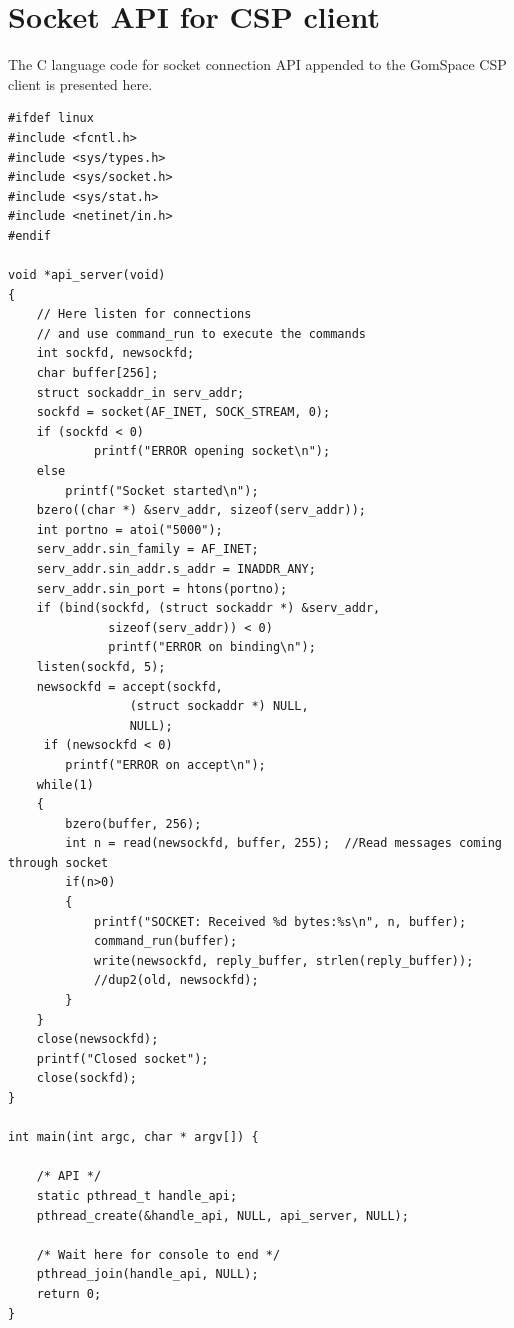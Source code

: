 \documentclass[english,12pt,a4paper,pdftex,elec,utf8]{aaltothesis}
\begin{document}
\section{Socket API for CSP client\label{LiiteD}}
The C language code for socket connection API appended to the GomSpace CSP client is presented here.
\begin{verbatim}
#ifdef linux
#include <fcntl.h>
#include <sys/types.h>
#include <sys/socket.h>
#include <sys/stat.h>
#include <netinet/in.h>
#endif

void *api_server(void)
{
	// Here listen for connections
	// and use command_run to execute the commands
	int sockfd, newsockfd;
    char buffer[256];
	struct sockaddr_in serv_addr;
	sockfd = socket(AF_INET, SOCK_STREAM, 0);
	if (sockfd < 0) 
        	printf("ERROR opening socket\n");
	else
		printf("Socket started\n");
	bzero((char *) &serv_addr, sizeof(serv_addr));
    int portno = atoi("5000");
    serv_addr.sin_family = AF_INET;
    serv_addr.sin_addr.s_addr = INADDR_ANY;
	serv_addr.sin_port = htons(portno);
	if (bind(sockfd, (struct sockaddr *) &serv_addr,
              sizeof(serv_addr)) < 0) 
              printf("ERROR on binding\n");
	listen(sockfd, 5);
	newsockfd = accept(sockfd, 
                 (struct sockaddr *) NULL, 
                 NULL);
     if (newsockfd < 0) 
        printf("ERROR on accept\n");
	while(1)
	{
		bzero(buffer, 256);
		int n = read(newsockfd, buffer, 255);  //Read messages coming through socket
		if(n>0)
		{
			printf("SOCKET: Received %d bytes:%s\n", n, buffer);
			command_run(buffer); 
			write(newsockfd, reply_buffer, strlen(reply_buffer));
			//dup2(old, newsockfd);
		}
	}
	close(newsockfd);
	printf("Closed socket");
	close(sockfd);	
}

int main(int argc, char * argv[]) {

    /* API */
	static pthread_t handle_api;
	pthread_create(&handle_api, NULL, api_server, NULL);
	
	/* Wait here for console to end */
	pthread_join(handle_api, NULL);
	return 0;
}
\end{verbatim}
\clearpage
\end{document}
